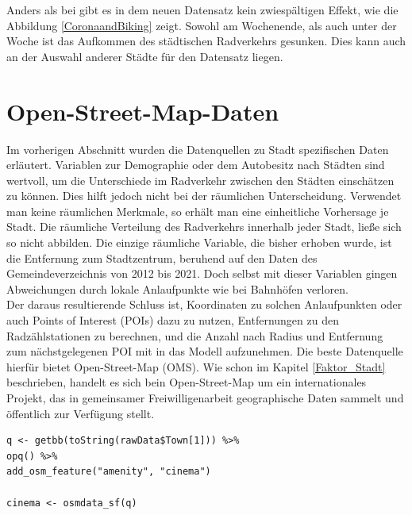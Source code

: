 \documentclass[a4paper,12pt]{thesis}
\begin{document}
Anders als bei \cite{Moellers2021} gibt es in dem neuen Datensatz kein zwiespältigen Effekt, wie die Abbildung \ref{CoronaandBiking} zeigt. Sowohl am Wochenende, als auch unter der Woche ist das Aufkommen des städtischen Radverkehrs gesunken. Dies kann auch an der Auswahl anderer Städte für den Datensatz liegen.

\section{Open-Street-Map-Daten}\label{OMSDATA}

Im vorherigen Abschnitt wurden die Datenquellen zu Stadt spezifischen Daten erläutert. Variablen zur Demographie oder dem Autobesitz nach Städten sind wertvoll, um die Unterschiede im Radverkehr zwischen den Städten einschätzen zu können. Dies hilft jedoch nicht bei der räumlichen Unterscheidung. Verwendet man keine räumlichen Merkmale, so erhält man eine einheitliche Vorhersage je Stadt. Die räumliche Verteilung des Radverkehrs innerhalb jeder Stadt, ließe sich so nicht abbilden. Die einzige räumliche Variable, die bisher erhoben wurde, ist die Entfernung zum Stadtzentrum, beruhend auf den Daten des Gemeindeverzeichnis von 2012 bis 2021. Doch selbst mit dieser Variablen gingen Abweichungen durch lokale Anlaufpunkte wie bei Bahnhöfen verloren.\\
Der daraus resultierende Schluss ist, Koordinaten zu solchen Anlaufpunkten oder auch Points of Interest (POIs) dazu zu nutzen, Entfernungen zu den Radzählstationen zu berechnen, und die Anzahl nach Radius und Entfernung zum nächstgelegenen POI mit in das Modell aufzunehmen. Die beste Datenquelle hierfür bietet Open-Street-Map (OMS). Wie schon im Kapitel \ref{Faktor_Stadt} beschrieben, handelt es sich bein Open-Street-Map um ein internationales Projekt, das in gemeinsamer Freiwilligenarbeit geographische Daten sammelt und öffentlich zur Verfügung stellt.\\

\begin{lstlisting}[caption={OSM Daten Abfrage},label=code:osmdata_query]
q <- getbb(toString(rawData$Town[1])) %>%
opq() %>%
add_osm_feature("amenity", "cinema")
	
cinema <- osmdata_sf(q)
\end{lstlisting}
\end{document}
